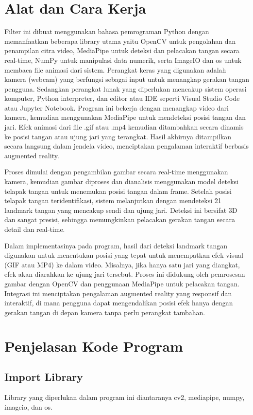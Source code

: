 \documentclass[11pt,a4paper]{article}
\begin{document}
\section{Alat dan Cara Kerja}
Filter ini dibuat menggunakan bahasa pemrograman Python dengan memanfaatkan beberapa library utama yaitu OpenCV untuk pengolahan dan penampilan citra video, MediaPipe untuk deteksi dan pelacakan tangan secara real-time, NumPy untuk manipulasi data numerik, serta ImageIO dan os untuk membaca file animasi dari sistem. Perangkat keras yang digunakan adalah kamera (webcam) yang berfungsi sebagai input untuk menangkap gerakan tangan pengguna. Sedangkan perangkat lunak yang diperlukan mencakup sistem operasi komputer, Python interpreter, dan editor atau IDE seperti Visual Studio Code atau Jupyter Notebook. Program ini bekerja dengan menangkap video dari kamera, kemudian menggunakan MediaPipe untuk mendeteksi posisi tangan dan jari. Efek animasi dari file .gif atau .mp4 kemudian ditambahkan secara dinamis ke posisi tangan atau ujung jari yang terangkat. Hasil akhirnya ditampilkan secara langsung dalam jendela video, menciptakan pengalaman interaktif berbasis augmented reality.
    
Proses dimulai dengan pengambilan gambar secara real-time menggunakan kamera, kemudian gambar diproses dan dianalisis menggunakan model deteksi telapak tangan untuk menemukan posisi tangan dalam frame. Setelah posisi telapak tangan teridentifikasi, sistem melanjutkan dengan mendeteksi 21 landmark tangan yang mencakup sendi dan ujung jari. Deteksi ini bersifat 3D dan sangat presisi, sehingga memungkinkan pelacakan gerakan tangan secara detail dan real-time.

Dalam implementasinya pada program, hasil dari deteksi landmark tangan digunakan untuk menentukan posisi yang tepat untuk menempatkan efek visual (GIF atau MP4) ke dalam video. Misalnya, jika hanya satu jari yang diangkat, efek akan diarahkan ke ujung jari tersebut. Proses ini didukung oleh pemrosesan gambar dengan OpenCV dan penggunaan MediaPipe untuk pelacakan tangan. Integrasi ini menciptakan pengalaman augmented reality yang responsif dan interaktif, di mana pengguna dapat mengendalikan posisi efek hanya dengan gerakan tangan di depan kamera tanpa perlu perangkat tambahan.
    
\section{Penjelasan Kode Program}
    \subsection{Import Library}
    Library yang diperlukan dalam program ini diantaranya cv2, mediapipe, numpy, imageio, dan os.
\end{document}
